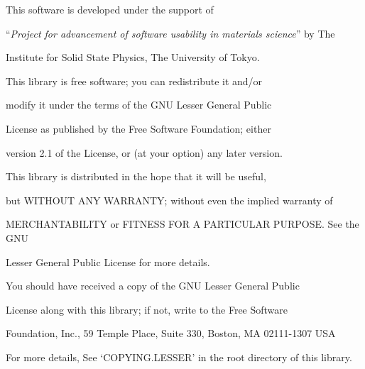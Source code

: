 \documentclass[letterpaper,10pt,dvipdfmx,openany]{sphinxmanual}
\begin{document}
\begin{DUlineblock}{0em}
\item[] This software is developed under the support of
\item[] ``\emph{Project for advancement of software usability in materials science}'' by The
\item[] Institute for Solid State Physics, The University of Tokyo.
\item[] 
\item[] This library is free software; you can redistribute it and/or
\item[] modify it under the terms of the GNU Lesser General Public
\item[] License as published by the Free Software Foundation; either
\item[] version 2.1 of the License, or (at your option) any later version.
\item[] This library is distributed in the hope that it will be useful,
\item[] but WITHOUT ANY WARRANTY; without even the implied warranty of
\item[] MERCHANTABILITY or FITNESS FOR A PARTICULAR PURPOSE. See the GNU
\item[] Lesser General Public License for more details.
\item[] 
\item[] You should have received a copy of the GNU Lesser General Public
\item[] License along with this library; if not, write to the Free Software
\item[] Foundation, Inc., 59 Temple Place, Suite 330, Boston, MA 02111-1307 USA
\item[] 
\item[] For more details, See `COPYING.LESSER' in the root directory of this library.
\end{DUlineblock}
\end{document}
